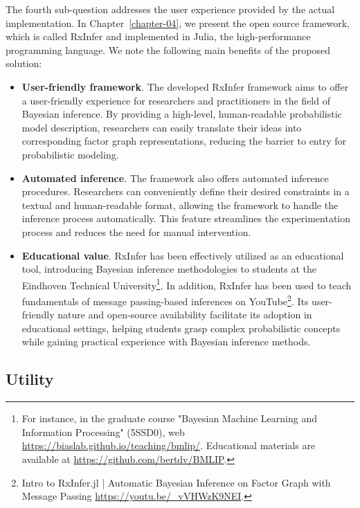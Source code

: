 The fourth sub-question addresses the user experience provided by the actual implementation.
In Chapter~\ref{chapter-04}, we present the open source framework, which is called RxInfer and
implemented in Julia, the high-performance programming language.
We note the following main benefits of the proposed solution:
\begin{itemize}
  \item
        \textbf{User-friendly framework}. The developed RxInfer framework aims to offer a
        user-friendly experience for researchers and practitioners in the field of Bayesian inference.
        By providing a high-level, human-readable probabilistic model description, researchers can
        easily translate their ideas into corresponding factor graph representations, reducing the
        barrier to entry for probabilistic modeling.
  \item \textbf{Automated inference}.
        The framework also offers automated inference procedures.
        Researchers can conveniently define their desired constraints in a textual and human-readable
        format, allowing the framework to handle the inference process automatically.
        This feature streamlines the experimentation process and reduces the need for manual
        intervention.
  \item \textbf{Educational value}. RxInfer has been effectively utilized as an educational tool, introducing Bayesian inference methodologies to students at the Eindhoven Technical University\footnote{For instance, in the graduate course "Bayesian Machine Learning and Information Processing" (5SSD0), web \url{https://biaslab.github.io/teaching/bmlip/}. Educational materials are available at \url{https://github.com/bertdv/BMLIP}.}.
  In addition, RxInfer has been used to teach fundamentals of message passing-based 
        inferences on YouTube\footnote{Intro to RxInfer.jl | Automatic Bayesian Inference on Factor Graph with Message Passing \url{https://youtu.be/_vVHWzK9NEI}.}.
        Its user-friendly nature and open-source availability facilitate its adoption in educational
        settings, helping students grasp complex probabilistic concepts while gaining practical
        experience with Bayesian inference methods. 
\end{itemize}

\subsection{Utility}

